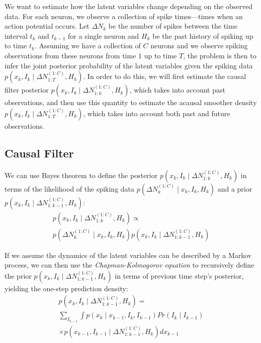 \documentclass[conference]{IEEEtran}
\begin{document}
We want to estimate how the latent variables change depending on the observed data. For each neuron, we observe a collection of spike times---times when an action potential occurs. Let $\Delta N_{k}$ be the number of spikes between the time interval $t_{k}$ and $t_{k-1}$ for a single neuron and $H_{k}$ be the past history of spiking up to time $t_{k}$. Assuming we have a collection of $C$ neurons and we observe spiking observations from these neurons from time $1$ up to time $T$, the problem is then to infer the joint posterior probability of the latent variables given the spiking data $p(x_{k}, I_{k} \mid \Delta N_{1:T}^{(1:C)}, H_{k})$. In order to do this, we will first estimate the causal filter posterior $p(x_{k}, I_{k} \mid \Delta N_{1:k}^{(1:C)}, H_{k})$, which takes into account past observations, and then use this quantity to estimate the acausal smoother density $p(x_{k}, I_{k} \mid \Delta N_{1:T}^{(1:C)}, H_{k})$, which takes into account both past and future observations.

\subsection{Causal Filter}
We can use Bayes theorem to define the posterior $p(x_{k}, I_{k} \mid \Delta N_{1:k}^{(1:C)}, H_{k})$ in terms of the likelihood of the spiking data $p(\Delta N_{k}^{(1:C)} \mid x_{k}, I_{k}, H_{k})$ and a prior $p(x_{k}, I_{k} \mid \Delta N_{1:k-1}^{(1:C)}, H_{k})$:
\begin{multline}
p(x_{k}, I_{k} \mid \Delta N_{1:k}^{(1:C)}, H_{k}) \propto \\
p(\Delta N_{k}^{(1:C)}  \mid x_{k}, I_{k}, H_{k}) p(x_{k}, I_{k} \mid \Delta N_{1:k-1}^{(1:C)}, H_{k}) 
\end{multline}

If we assume the dynamics of the latent variables can be described by a Markov process, we can then use the \textit{Chapman-Kolmogorov equation} to recursively define the prior $p(x_{k}, I_{k} \mid \Delta N_{1:k-1}^{(1:C)}, H_{k})$ in terms of previous time step's posterior, yielding the one-step prediction density:
\begin{multline}
p(x_{k}, I_{k} \mid \Delta N_{1:k-1}^{(1:C)}, H_{k}) = \\
\sum_{I_{k-1}} \int p(x_{k} \mid x_{k-1}, I_{k}, I_{k-1}) Pr(I_{k} \mid I_{k-1}) \\
\times p(x_{k-1}, I_{k-1} \mid \Delta N_{1:k-1}^{(1:C)}, H_{k}) dx_{k-1}
\end{multline}
\end{document}
